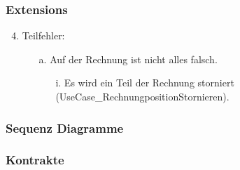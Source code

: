 \documentclass[./detailed_overview_usecases.tex]{subfiles}
\begin{document}
    \subsubsection*{Extensions}
    \begin{enumerate}
        \setcounter{enumi}{3}
        \item Teilfehler:
        \begin{itemize}
            \item[a.] Auf der Rechnung ist nicht alles falsch.
            \begin{itemize}
                \item[i.] Es wird ein Teil der Rechnung storniert (UseCase_RechnungpositionStornieren).
            \end{itemize}
        \end{itemize}
    \end{enumerate}
    \subsubsection{Sequenz Diagramme}
    \subsubsection{Kontrakte}
\end{document}
